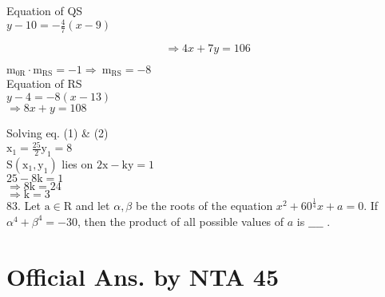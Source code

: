 \documentclass[10pt]{article}
\begin{document}
Equation of QS\\
\(y-10=-\frac{4}{7}(x-9)\)

\[
\Rightarrow 4 x+7 y=106
\]

\(\mathrm{m}_{0 \mathrm{R}} \cdot \mathrm{m}_{\mathrm{RS}}=-1 \Rightarrow \mathrm{~m}_{\mathrm{RS}}=-8\)\\
Equation of RS\\
\(y-4=-8(x-13)\)\\
\(\Rightarrow 8 x+y=108\)

Solving eq. (1) \& (2)\\
\(\mathrm{x}_{1}=\frac{25}{2} \mathrm{y}_{1}=8\)\\
\(\mathrm{S}\left(\mathrm{x}_{1}, \mathrm{y}_{1}\right)\) lies on \(2 \mathrm{x}-\mathrm{ky}=1\)\\
\(25-8 \mathrm{k}=1\)\\
\(\Rightarrow 8 \mathrm{k}=24\)\\
\(\Rightarrow \mathrm{k}=3\)\\
83. Let \(\mathrm{a} \in \mathrm{R}\) and let \(\alpha, \beta\) be the roots of the equation \(x^{2}+60^{\frac{1}{4}} x+a=0\). If \(\alpha^{4}+\beta^{4}=-30\), then the product of all possible values of \(a\) is \(\_\_\_\_\) .

\section*{Official Ans. by NTA 45}
\end{document}
